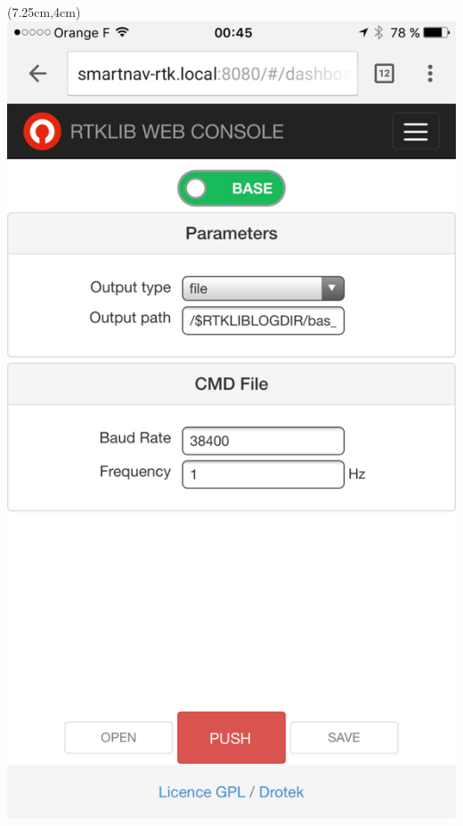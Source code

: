 \documentclass[xetex,t]{beamer}
\begin{document}
\begin{frame}
\begin{textblock*}{3.5cm}
  \end{textblock*}
  \begin{textblock*}{1.75cm}(7.25cm,4cm)
    \includegraphics[width=\textwidth]{../img/drotek-web}
  \end{textblock*}
\end{frame}
\end{document}
